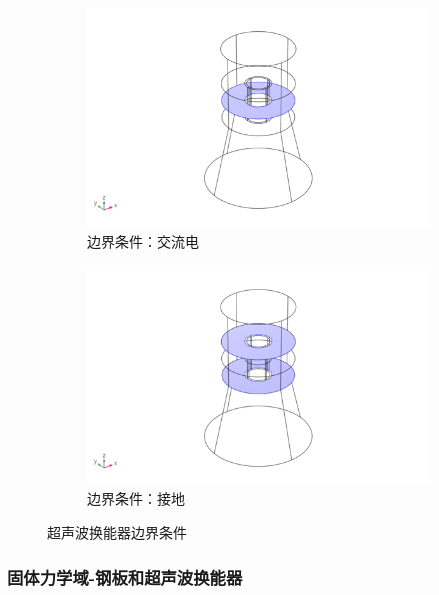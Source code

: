 \documentclass[fontset=windows,12pt,a4paper]{ctexart}
\begin{document}
\begin{figure}[h]
  \centering
  \begin{subfigure}{0.4\textwidth}
    \centering
    \includegraphics[width=\textwidth]{assets/ultrasonic_transducer_boundry_condition_v1.png}
    \caption{边界条件：交流电}
    \label{pic:边界条件：交流电}
  \end{subfigure}
  \hfill
  \begin{subfigure}{0.4\textwidth}
    \centering
    \includegraphics[width=\textwidth]{assets/ultrasonic_transducer_boundry_condition_v0.png}
    \caption{边界条件：接地}
    \label{pic:边界条件：接地}
  \end{subfigure}
  \caption{超声波换能器边界条件}
\end{figure}

\subsubsection{固体力学域-钢板和超声波换能器}
\end{document}
